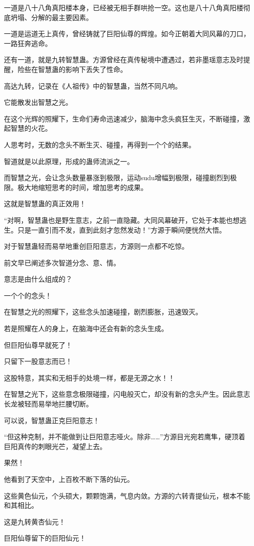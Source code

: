 \begin{this_body}
一道是八十八角真阳楼本身，已经被无相手群哄抢一空。这也是八十八角真阳楼彻底坍塌、分解的最主要因素。

一道是运道无上真传，曾经铸就了巨阳仙尊的辉煌。如今正朝着大同风幕的刀口，一路狂奔逃命。

还有一道，就是九转智慧蛊。方源曾经在真传秘境中遭遇过，若非墨瑶意志及时提醒，险些在智慧蛊的影响下丢失了性命。

高达九转，记录在《人祖传》中的智慧蛊，当然不同凡响。

它能散发出智慧之光。

在这个光辉的照耀下，生命们寿命迅速减少，脑海中念头疯狂生灭，不断碰撞，激起智慧的火花。

人思考时，无数的念头不断生灭、碰撞，再得到一个个的结果。

智道就是以此原理，形成的蛊师流派之一。

而智慧之光，会让念头数量暴涨到极限，运动sudu增幅到极限，碰撞剧烈到极限。极大地缩短思考的时间，增加思考的成果。

这就是智慧蛊的真正效用！

“对啊，智慧蛊也是野生意志，之前一直隐藏。大同风幕破开，它处于本能也想逃生。只是一直引而不发，直到此刻才忽然发动！”方源于瞬间便恍然大悟。

对于智慧蛊轻而易举地重创巨阳意志，方源则一点都不吃惊。

前文早已阐述多次智道分念、意、情。

意志是由什么组成的？

一个个的念头！

在智慧之光的照耀下，这些念头加速碰撞，剧烈膨胀，迅速毁灭。

若是照耀在人的身上，在脑海中还会有新的念头生成。

但巨阳仙尊早就死了！

只留下一股意志而已！

这股特意，其实和无相手的处境一样，都是无源之水！！

在智慧之光下，这些意念极限碰撞，闪电般灭亡，却没有新的念头产生。因此意志长龙被轻而易举地拦腰切断。

可以说，智慧蛊正克巨阳意志！

“但这种克制，并不能做到让巨阳意志哑火。除非……”方源目光宛若鹰隼，硬顶着巨阳真传的刺眼光芒，凝望上去。

果然！

他看到了天空中，上百枚不断下落的仙元。

这些黄色仙元，个头硕大，颗颗饱满，气息内敛。方源的六转青提仙元，根本不能和其相比。

这是九转黄杏仙元！

巨阳仙尊留下的巨阳仙元！

\end{this_body}

